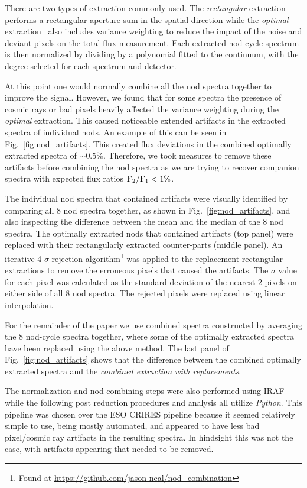 \documentclass[fleqn,usenatbib]{mnras}
\begin{document}
There are two types of extraction commonly used. The \emph{rectangular} extraction performs a rectangular aperture sum in the spatial direction while the \emph{optimal} extraction~\citep{horne_optimal_1986} also includes variance weighting to reduce the impact of the noise and deviant pixels on the total flux measurement. Each extracted nod-cycle spectrum is then normalized by dividing by a polynomial fitted to the continuum, with the degree selected for each spectrum and detector.

At this point one would normally combine all the nod spectra together to improve the signal. However, we found that for some spectra the presence of cosmic rays or bad pixels heavily affected the variance weighting during the \emph{optimal} extraction. This caused noticeable extended artifacts in the extracted spectra of individual nods. An example of this can be seen in Fig.~\ref{fig:nod_artifacts}. This created flux deviations in the combined optimally extracted spectra of \(\sim 0.5\% \). Therefore, we took measures to remove these artifacts before combining the nod spectra as we are trying to recover companion spectra with expected flux ratios \(\rm {F_2}/{F_1} < 1\% \). 

The individual nod spectra that contained artifacts were visually identified by comparing all 8 nod spectra together, as shown in Fig.~\ref{fig:nod_artifacts}, and also inspecting the difference between the mean and the median of the 8 nod spectra. The optimally extracted nods that contained artifacts (top panel) were replaced with their rectangularly extracted counter-parts (middle panel). An iterative 4-\(\sigma \) rejection algorithm\footnote{Found at \url{https://github.com/jason-neal/nod_combination}} was applied to the replacement rectangular extractions to remove the erroneous pixels that caused the artifacts. The \(\sigma\) value for each pixel was calculated as the standard deviation of the nearest 2 pixels on either side of all 8 nod spectra. The rejected pixels were replaced using linear interpolation.

For the remainder of the paper we use combined spectra constructed by averaging the 8 nod-cycle spectra together, where some of the optimally extracted spectra have been replaced using the above method. The last panel of Fig.~\ref{fig:nod_artifacts} shows that the difference between the combined optimally extracted spectra and the \emph{combined extraction with replacements}.


The normalization and nod combining steps were also performed using IRAF while the following post reduction procedures and analysis all utilize \emph{Python}. This pipeline was chosen over the ESO CRIRES pipeline because it seemed relatively simple to use, being mostly automated, and appeared to have less bad pixel/cosmic ray artifacts in the resulting spectra. In hindsight this was not the case, with artifacts appearing that needed to be removed. 
\end{document}
